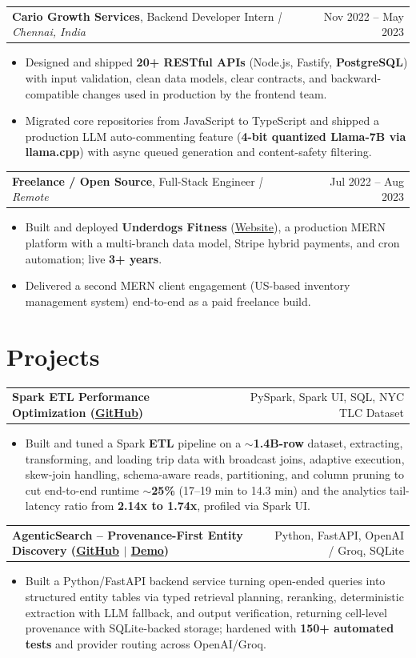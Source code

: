 \documentclass[letterpaper,11pt]{article}
\makeatletter
\newcommand{\expItem}[4]{%
  \vspace{2pt}
  \begin{tabular*}{\textwidth}{@{}l@{\extracolsep{\fill}}r@{}}
    \textbf{#1}, #2 \textit{| #3} & #4 \\
  \end{tabular*}\par\vspace{-2pt}
}
\newcommand{\projItem}[2]{%
  \vspace{4pt}
  \begin{tabular*}{\textwidth}{@{}l@{\extracolsep{\fill}}r@{}}
    \textbf{#1} & #2 \\
  \end{tabular*}\par\vspace{-2pt}
}
\makeatother
\begin{document}
\expItem{Cario Growth Services}{Backend Developer Intern}{Chennai, India}{Nov 2022 -- May 2023}
\begin{itemize}
  \item Designed and shipped \textbf{20+ RESTful APIs} (Node.js, Fastify, \textbf{PostgreSQL}) with input validation, clean data models, clear contracts, and backward-compatible changes used in production by the frontend team.
  \item Migrated core repositories from JavaScript to TypeScript and shipped a production LLM auto-commenting feature (\textbf{4-bit quantized Llama-7B via llama.cpp}) with async queued generation and content-safety filtering.
\end{itemize}

\expItem{Freelance / Open Source}{Full-Stack Engineer}{Remote}{Jul 2022 -- Aug 2023}
\begin{itemize}
  \item Built and deployed \textbf{Underdogs Fitness} (\href{https://www.underdogsfitness.in/}{Website}), a production MERN platform with a multi-branch data model, Stripe hybrid payments, and cron automation; live \textbf{3+ years}.
  \item Delivered a second MERN client engagement (US-based inventory management system) end-to-end as a paid freelance build.
\end{itemize}

\section{Projects}

\projItem{Spark ETL Performance Optimization {\normalfont\small(\href{https://github.com/Deva-1903/Spark-ETL-Optimization}{GitHub})}}{PySpark, Spark UI, SQL, NYC TLC Dataset}
\begin{itemize}
  \item Built and tuned a Spark \textbf{ETL} pipeline on a \textbf{$\sim$1.4B-row} dataset, extracting, transforming, and loading trip data with broadcast joins, adaptive execution, skew-join handling, schema-aware reads, partitioning, and column pruning to cut end-to-end runtime \textbf{$\sim$25\%} (17--19 min to 14.3 min) and the analytics tail-latency ratio from \textbf{2.14x to 1.74x}, profiled via Spark UI.
\end{itemize}

\projItem{AgenticSearch -- Provenance-First Entity Discovery {\normalfont\small(\href{https://github.com/Deva-1903/ciir_agentic_search}{GitHub} $\vert$ \href{https://agentic-search-negglszkwa-uc.a.run.app}{Demo})}}{Python, FastAPI, OpenAI / Groq, SQLite}
\begin{itemize}
  \item Built a Python/FastAPI backend service turning open-ended queries into structured entity tables via typed retrieval planning, reranking, deterministic extraction with LLM fallback, and output verification, returning cell-level provenance with SQLite-backed storage; hardened with \textbf{150+ automated tests} and provider routing across OpenAI/Groq.
\end{itemize}
\end{document}
